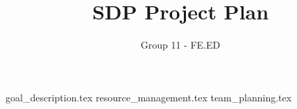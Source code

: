 \documentclass[onecolumn]{IEEEtran}
\begin{document}
\title{SDP Project Plan}
\author{Group 11 - FE.ED}
\date{} %

\maketitle

\tableofcontents

{goal_description.tex}
{resource_management.tex}
{team_planning.tex}
\printbibliography
\end{document}
